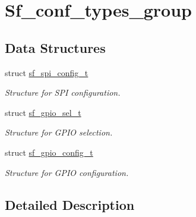 \hypertarget{group__sf__conf__types__group}{}\section{Sf\+\_\+conf\+\_\+types\+\_\+group}
\label{group__sf__conf__types__group}
\subsection*{Data Structures}
\begin{DoxyCompactItemize}
\item 
struct \mbox{\hyperlink{structsf__spi__config__t}{sf\+\_\+spi\+\_\+config\+\_\+t}}
\begin{DoxyCompactList}\small\item\em Structure for S\+PI configuration. \end{DoxyCompactList}\item 
struct \mbox{\hyperlink{structsf__gpio__sel__t}{sf\+\_\+gpio\+\_\+sel\+\_\+t}}
\begin{DoxyCompactList}\small\item\em Structure for G\+P\+IO selection. \end{DoxyCompactList}\item 
struct \mbox{\hyperlink{structsf__gpio__config__t}{sf\+\_\+gpio\+\_\+config\+\_\+t}}
\begin{DoxyCompactList}\small\item\em Structure for G\+P\+IO configuration. \end{DoxyCompactList}\end{DoxyCompactItemize}


\subsection{Detailed Description}
